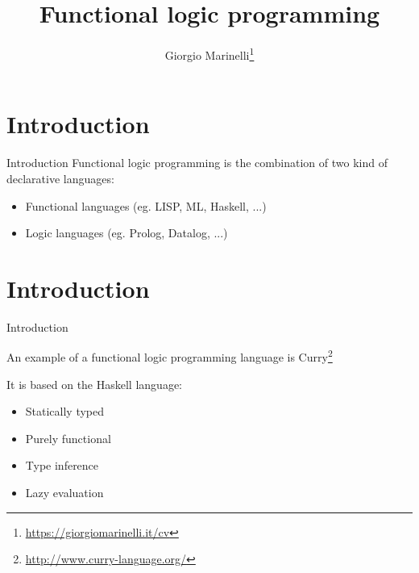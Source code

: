 \documentclass{beamer}
\title{Functional logic programming}
\author{Giorgio Marinelli\thanks{\url{https://giorgiomarinelli.it/cv}}}
\begin{document}

\begin{frame}
  \titlepage
\end{frame}


\section{Introduction}
\begin{frame}{Introduction}
Functional logic programming is the combination of two kind of declarative languages:
\begin{itemize}
  \item Functional languages (eg. LISP, ML, Haskell, ...)
  \item Logic languages (eg. Prolog, Datalog, ...)
\end{itemize}

\end{frame}


\section{Introduction}
\begin{frame}{Introduction}

An example of a functional logic programming language is Curry\footnote{\url{http://www.curry-language.org/}}

\vspace{1em}

It is based on the Haskell language:

\vspace{1em}

\begin{itemize}
  \item Statically typed
  \item Purely functional
  \item Type inference
  \item Lazy evaluation
\end{itemize}

\end{frame}

\end{document}

